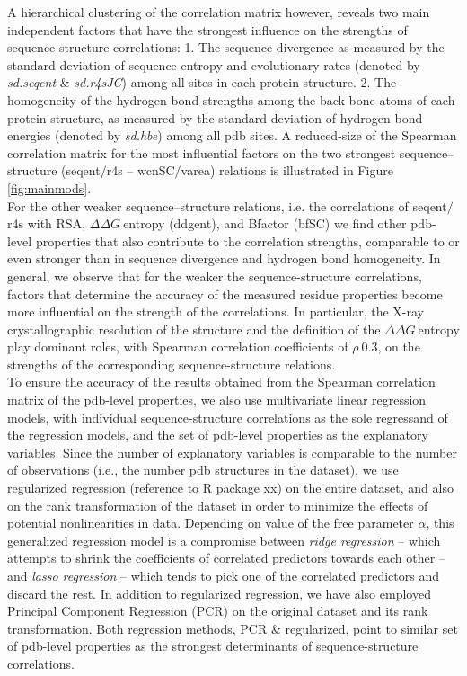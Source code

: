\documentclass[12pt]{article}
\newcommand{\ddg}{$\Delta\Delta G~$}
\begin{document}
        A hierarchical clustering of the correlation matrix however, reveals two main independent factors that have the strongest influence on the strengths of sequence-structure correlations: 1. The sequence divergence as measured by the standard deviation of sequence entropy and evolutionary rates (denoted by {\it sd.seqent} \& {\it sd.r4sJC}) among all sites in each protein structure.   2. The homogeneity of the hydrogen bond strengths among the back bone atoms of each protein structure, as measured by the standard deviation of hydrogen bond energies (denoted by {\it sd.hbe}) among all pdb sites.   A reduced-size of the Spearman correlation matrix for the most influential factors on the two strongest sequence--structure (seqent$/$r4s -- wcnSC$/$varea) relations is illustrated in Figure \ref{fig:mainmods}.
        \\

        For the other weaker sequence--structure relations, i.e. the correlations of seqent$/$r4s with RSA, \ddg entropy (ddgent), and Bfactor (bfSC) we find other pdb-level properties that also contribute to the correlation strengths, comparable to or even stronger than in sequence divergence and hydrogen bond homogeneity. In general, we observe that for the weaker the sequence-structure correlations, factors that determine the accuracy of the measured residue properties become more influential on the strength of the correlations. In particular, the X-ray crystallographic resolution of the structure and the definition of the \ddg entropy play dominant roles, with Spearman correlation coefficients of $\rho~0.3$, on the strengths of the corresponding sequence-structure relations.
        \\

        To ensure the accuracy of the results obtained from the Spearman correlation matrix of the pdb-level properties, we also use multivariate linear regression models, with individual sequence-structure correlations as the sole regressand of the regression models, and the set of pdb-level properties as the explanatory variables.  Since the number of explanatory variables is comparable to the number of observations (i.e., the number pdb structures in the dataset), we use regularized regression {\color{red}(reference to R package xx)} on the entire dataset, and also on the rank transformation of the dataset in order to minimize the effects of potential nonlinearities in data. Depending on value of the free parameter $\alpha$, this generalized regression model is a compromise between {\it ridge regression} -- which attempts to shrink the coefficients of correlated predictors towards each other -- and {\it lasso regression} -- which tends to pick one of the correlated predictors and discard the rest. In addition to regularized regression, we have also employed Principal Component Regression (PCR) on the original dataset and its rank transformation. Both regression methods, PCR \& regularized, point to similar set of pdb-level properties as the strongest determinants of sequence-structure correlations.
\end{document}
